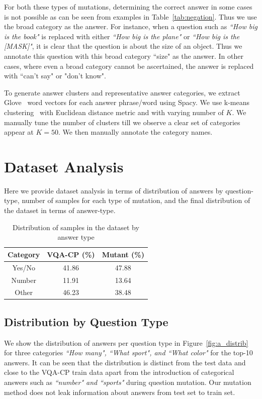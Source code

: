     For both these types of mutations, determining the correct answer in some cases is not possible as can be seen from examples in Table~\ref{tab:negation}.
    Thus we use the broad category as the answer. 
    For instance, when a question such as \textit{``How big is the book"} is replaced with either \textit{``How big is the plane"} or \textit{``How big is the [MASK]"}, it is clear that the question is about the size of an object.
    Thus we annotate this question with this broad category ``size" as the answer.
    In other cases, where even a broad category cannot be ascertained, the answer is replaced with ``can't say" or "don't know".
    



    To generate answer clusters and representative answer categories, we extract Glove~\cite{pennington2014glove} word vectors for each answer phrase/word using Spacy. 
    We use k-means clustering~\cite{lloyd1982least} with Euclidean distance metric and with varying number of $K$. 
    We manually tune the number of clusters till we observe a clear set of categories appear at $K=50$.
    We then manually annotate the category names.


\section{Dataset Analysis}
Here we provide dataset analysis in terms of distribution of answers by question-type, number of samples for each type of mutation, and the final distribution of the dataset in terms of answer-type.

\begin{table}[t]
    \centering
    \small
    \begin{tabular}{| c | c | c |}
        \hline
        \textbf{Category} & \textbf{VQA-CP (\%)} & \textbf{Mutant (\%)}\\
        \hline 
        Yes/No & 41.86 & 47.88 \\
        Number & 11.91 & 13.64 \\
        Other  & 46.23 & 38.48 \\
        \hline
    \end{tabular}
    \caption{Distribution of samples in the dataset by answer type}
    \label{tab:ans_type}
\end{table}
    \subsection{Distribution by Question Type}
    We show the distribution of answers per question type in Figure~\ref{fig:a_distrib} for three categories \textit{``How many", ``What sport", and ``What color"} for the top-10 answers.
    It can be seen that the distribution is distinct from the test data and close to the VQA-CP train data apart from the introduction of categorical answers such as \textit{``number" and ``sports"} during question mutation.
    Our mutation method does not leak information about answers from test set to train set.

